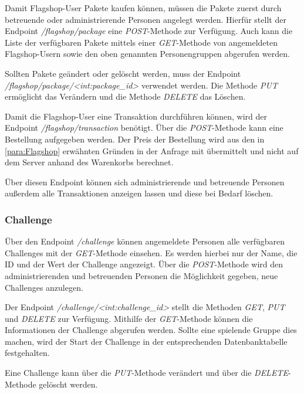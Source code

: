 \newpage
Damit Flagshop-User Pakete kaufen können, müssen die Pakete zuerst durch betreuende oder administrierende Personen angelegt werden. Hierfür stellt der Endpoint \textit{/flagshop/package} eine \textit{POST}-Methode zur Verfügung. Auch kann die Liste der verfügbaren Pakete mittels einer \textit{GET}-Methode von angemeldeten Flagshop-Usern sowie den oben genannten \linebreak Personengruppen abgerufen werden.

Sollten Pakete geändert oder gelöscht werden, muss der Endpoint \linebreak \textit{/flagshop/package/<int:package\_id>} verwendet werden. Die Methode \textit{PUT} ermöglicht das Verändern und die Methode \textit{DELETE} das Löschen.

Damit die Flagshop-User eine Transaktion durchführen können, wird der Endpoint \linebreak\textit{/flagshop/transaction} benötigt. Über die \textit{POST}-Methode kann eine Bestellung aufgegeben werden. Der Preis der Bestellung wird aus den in \autoref{para:Flagshop} erwähnten Gründen in der Anfrage mit übermittelt und nicht auf dem Server anhand des Warenkorbs berechnet.

Über diesen Endpoint können sich administrierende und betreuende Personen außerdem alle Transaktionen anzeigen lassen und diese bei Bedarf löschen.

\subsubsection{Challenge}
Über den Endpoint \textit{/challenge} können angemeldete Personen alle verfügbaren \linebreak Challenges mit der \textit{GET}-Methode einsehen. Es werden hierbei nur der Name, die ID und der Wert der Challenge angezeigt. Über die \textit{POST}-Methode wird den administrierenden und betreuenden Personen die Möglichkeit gegeben, neue Challenges anzulegen.

Der Endpoint \textit{/challenge/<int:challenge\_id>} stellt die Methoden \textit{GET}, \textit{PUT} und \textit{DELETE} zur Verfügung. Mithilfe der \textit{GET}-Methode können die Informationen der Challenge abgerufen werden. Sollte eine spielende Gruppe dies machen, wird der Start der Challenge in der entsprechenden Datenbanktabelle festgehalten.

Eine Challenge kann über die \textit{PUT}-Methode verändert und über die \textit{DELETE}-Methode \linebreak gelöscht werden.

